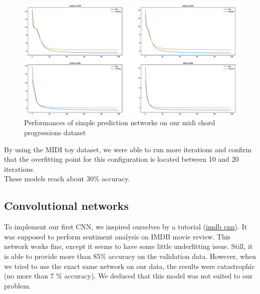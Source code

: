 \documentclass{article}
\begin{document}
\begin{figure}[H]
\centering
\includegraphics[width =1\textwidth]{Ex2Midi.eps}
\caption{Performances of simple prediction networks on our midi chord progressions dataset}
\label{rnnmidi0}
\end{figure}

By using the MIDI toy dataset, we were able to run more iterations and confirm that the overfitting point for this configuration is located between 10 and 20 iterations. \\
These models reach about 30\% accuracy.

\subsection{Convolutional networks}

To implement our first CNN, we inspired ourselves by a tutorial (\href{https://medium.com/@thoszymkowiak/how-to-implement-sentiment-analysis-using-word-embedding-and-convolutional-neural-networks-on-keras-163197aef623}{imdb cnn}). It was supposed to perform sentiment analysis on IMDB movie review. This network works fine, except it seems to have some little underfitting issue. Still, it is able to provide more than 85\% accuracy on the validation data. However, when we tried to use the exact same network on our data, the results were catastrophic (no more than 7 \% accuracy). We deduced that this model was not suited to our problem.
\end{document}
